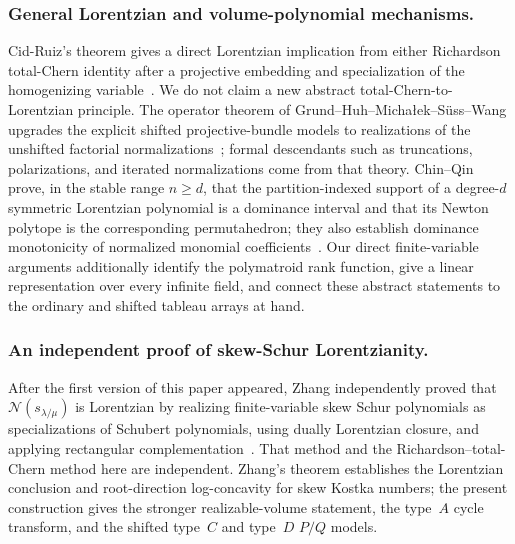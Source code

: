 \documentclass[11pt,a4paper,oneside]{amsart}
\numberwithin{equation}{section}
\theoremstyle{definition}
\theoremstyle{remark}
\newcommand{\cN}{\mathcal N}
\begin{document}
\subsubsection{General Lorentzian and volume-polynomial mechanisms.}
Cid-Ruiz's theorem gives a direct Lorentzian implication from either Richardson total-Chern identity after a projective embedding and specialization of the homogenizing variable~\cite[Proposition~6.2]{CidRuiz26}.  We do not claim a new abstract total-Chern-to-Lorentzian principle.  The operator theorem of Grund--Huh--Micha\l ek--S\"uss--Wang upgrades the explicit shifted projective-bundle models to realizations of the unshifted factorial normalizations~\cite[Definition~1.2 and Theorem~1.3]{GHMSW25}; formal descendants such as truncations, polarizations, and iterated normalizations come from that theory.  Chin--Qin prove, in the stable range $n\geq d$, that the partition-indexed support of a degree-$d$ symmetric Lorentzian polynomial is a dominance interval and that its Newton polytope is the corresponding permutahedron; they also establish dominance monotonicity of normalized monomial coefficients~\cite[Theorems~3.7, 3.9, and~3.16]{ChinQin25}.  Our direct finite-variable arguments additionally identify the polymatroid rank function, give a linear representation over every infinite field, and connect these abstract statements to the ordinary and shifted tableau arrays at hand.

\subsubsection{An independent proof of skew-Schur Lorentzianity.}
After the first version of this paper appeared, Zhang independently proved that $\cN(s_{\lambda/\mu})$ is Lorentzian by realizing finite-variable skew Schur polynomials as specializations of Schubert polynomials, using dually Lorentzian closure, and applying rectangular complementation~\cite{Zhang26}.  That method and the Richardson--total-Chern method here are independent.  Zhang's theorem establishes the Lorentzian conclusion and root-direction log-concavity for skew Kostka numbers; the present construction gives the stronger realizable-volume statement, the type~$A$ cycle transform, and the shifted type~$C$ and type~$D$ $P/Q$ models.
\end{document}
